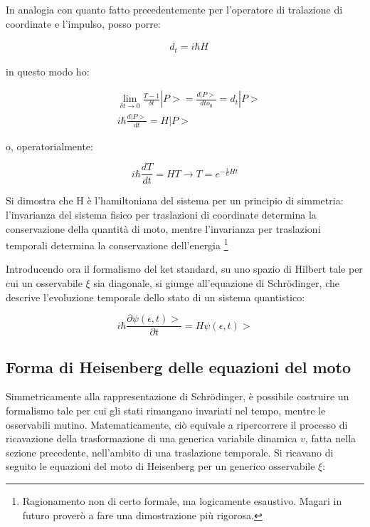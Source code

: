 \documentclass{article}
\begin{document}
In analogia con quanto fatto precedentemente per l'operatore di tralazione di coordinate e l'impulso, posso porre:

\begin{equation}
    \begin{aligned}
    & d_t= i\hbar H
    \end{aligned}
\end{equation}

in questo modo ho:

\begin{equation}
    \begin{aligned}
    & \lim_{\delta t \rightarrow 0} \frac{T-1}{\delta t}|P>= \frac{d |P>}{d to_0}= d_t |P> \\
    & i\hbar \frac{d |P>}{dt}= H|P>
    \end{aligned}
\end{equation}

o, operatorialmente:

\begin{equation}
    i\hbar \frac{d T}{dt}= HT \rightarrow T=e^{-\frac{i}{\hbar}Ht}
\end{equation}

Si dimostra che H è l'hamiltoniana del sistema per un principio di simmetria:
l'invarianza del sistema fisico per traslazioni di coordinate determina la conservazione della quantità di moto,
mentre l'invarianza per traslazioni temporali determina la conservazione dell'energia \footnote{
    Ragionamento non di certo formale, ma logicamente esaustivo. Magari in futuro proverò a fare una dimostrazione
    più rigorosa.
}

Introducendo ora il formalismo del ket standard, su uno spazio di Hilbert tale per cui un osservabile $\xi$ sia diagonale,
si giunge all'equazione di Schrödinger, che descrive l'evoluzione temporale dello stato di un sistema quantistico:

\begin{equation}
    i\hbar \frac{\partial \psi(\epsilon,t)>}{\partial t}= H\psi(\epsilon,t)>
\end{equation}

\subsection{Forma di Heisenberg delle equazioni del moto}
Simmetricamente alla rappresentazione di Schrödinger, è possibile costruire un formalismo tale per cui gli stati rimangano invariati nel tempo,
mentre le osservabili mutino.
Matematicamente, ciò equivale a ripercorrere il processo di ricavazione della trasformazione di una generica variabile dinamica $v$, fatta nella sezione precedente,
nell'ambito di una traslazione temporale.
Si ricavano di seguito le equazioni del moto di Heisenberg per un generico osservabile $\xi$:
\end{document}
